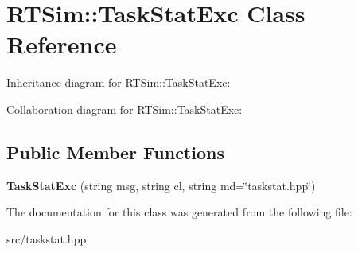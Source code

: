 \hypertarget{classRTSim_1_1TaskStatExc}{}\section{R\+T\+Sim\+:\+:Task\+Stat\+Exc Class Reference}
\label{classRTSim_1_1TaskStatExc}


Inheritance diagram for R\+T\+Sim\+:\+:Task\+Stat\+Exc\+:


Collaboration diagram for R\+T\+Sim\+:\+:Task\+Stat\+Exc\+:
\subsection*{Public Member Functions}
\begin{DoxyCompactItemize}
\item 
{\bfseries Task\+Stat\+Exc} (string msg, string cl, string md=\char`\"{}taskstat.\+hpp\char`\"{})\hypertarget{classRTSim_1_1TaskStatExc_a65b931beac6c660f97375f965fdbecf1}{}\label{classRTSim_1_1TaskStatExc_a65b931beac6c660f97375f965fdbecf1}

\end{DoxyCompactItemize}


The documentation for this class was generated from the following file\+:\begin{DoxyCompactItemize}
\item 
src/taskstat.\+hpp\end{DoxyCompactItemize}
